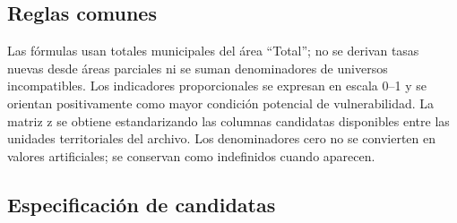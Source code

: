 \subsection{Reglas comunes}

Las fórmulas usan totales municipales del área \enquote{Total}; no se derivan tasas nuevas desde áreas parciales ni se suman denominadores de universos incompatibles. Los indicadores proporcionales se expresan en escala 0--1 y se orientan positivamente como mayor condición potencial de vulnerabilidad. La matriz z se obtiene estandarizando las columnas candidatas disponibles entre las unidades territoriales del archivo. Los denominadores cero no se convierten en valores artificiales; se conservan como indefinidos cuando aparecen.

\subsection{Especificación de candidatas}

